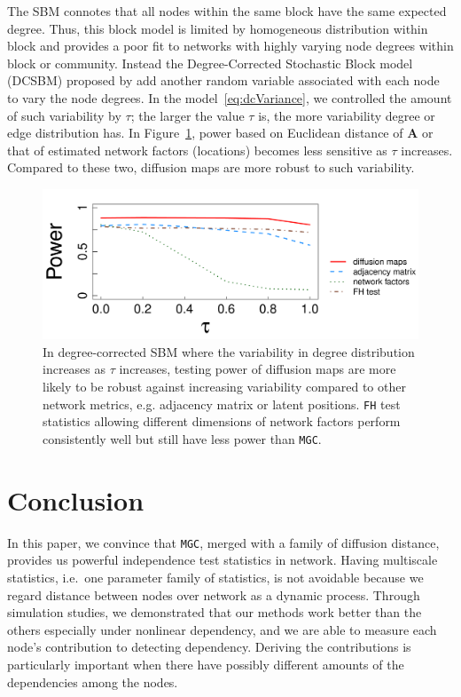 \documentclass[11pt]{article}
\theoremstyle{definition}
\begin{document}
The SBM connotes that all nodes within the same block have the same expected degree. Thus, this block model is limited by homogeneous distribution within block and provides a poor fit to networks with highly varying node degrees within block or community. Instead the Degree-Corrected Stochastic Block model (DCSBM) proposed by \cite{karrer2011stochastic} add another random variable associated with each node to vary the node degrees. In the model~\ref{eq:dcVariance}, we controlled the amount of such variability by $\tau$; the larger the value $\tau$ is, the more variability degree or edge distribution has. In Figure~\ref{fig:dcSBM}, power based on Euclidean distance of $\mathbf{A}$ or that of estimated network factors (locations) becomes less sensitive as $\tau$ increases. Compared to these two, diffusion maps are more robust to such variability. 
\begin{figure}[h]
	\centering
	\includegraphics[width=0.7\linewidth]{../Figure/tau_simple.pdf}
	\caption{In degree-corrected SBM where the variability in degree distribution increases as $\tau$ increases, testing power of diffusion maps are more likely to be robust against increasing variability compared to other network metrics, e.g. adjacency matrix or latent positions. \texttt{FH} test statistics allowing different dimensions of network factors perform consistently well but still have less power than \texttt{MGC}.}
	\label{fig:dcSBM}
	\vspace*{-0.5cm}
\end{figure}	
\vspace*{-0.5cm}
\section{Conclusion}
\label{sec:conc}
	\vspace*{-0.2cm}
In this paper, we convince that \texttt{MGC}, merged with a family of diffusion distance, provides us powerful independence test statistics in network. Having multiscale statistics, i.e.~one parameter family of statistics, is not avoidable because we regard distance between nodes over network as a dynamic process. Through simulation studies, we demonstrated that our methods work better than the others especially under nonlinear dependency, and we are able to measure each node's contribution to detecting dependency. Deriving the contributions is particularly important when there have possibly different amounts of the dependencies among the nodes.  
\end{document}
